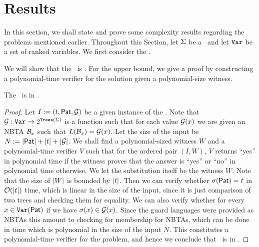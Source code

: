 \section{Results}\label{sec:results_atomicTreeTransforms}

In this section, we shall state and prove some complexity results regarding the problems mentioned earlier. Throughout this Section, let $\Sigma$ be a \rab\ and let $\texttt{Var}$ be a set of ranked variables. We first consider the \matchingProblemFull.

\begin{problem}
    \problemtitle{\matchingProblemFull}
\end{problem}

We will show that the \matchingProblemFull\ is \npc. For the upper bound, we give a proof by constructing a polynomial-time verifier for the solution given a polynomial-size witness.

\begin{theorem}\label{thm:matchingProblemUpperBound}
    The \matchingProblemFull\ is in \np.
\end{theorem}

\begin{proof}
    Let $I := (t, \mathsf{Pat}, \mathcal{G})$ be a given instance of the \matchingProblemFull. Note that $\mathcal{G} : \texttt{Var} \to 2^{\texttt{Trees}\left(\Sigma\right)}$ is a function such that for each value $\mathcal{G}(x)$ we are given an NBTA $\mathcal{B}_x$ such that $L(\mathcal{B}_x) = \mathcal{G}(x)$. Let the size of the input be $N := \left\lvert \mathsf{Pat} \right\rvert + \left\lvert t \right\rvert + \left\lvert \mathcal{G} \right\rvert$.
    We shall find a polynomial-sized witness $W$ and a polynomial-time verifier $V$ such that for the ordered pair $(I, W)$, $V$ returns ``yes'' in polynomial time if the witness proves that the answer is ``yes'' or ``no'' in polynomial time otherwise. We let the substitution itself be the witness $W$. Note that the size of $\left\lvert W \right\rvert$ is bounded by $\left\lvert t \right\rvert$. Then we can verify whether $\sigma(\mathsf{Pat}) = t$ in $\mathcal{O}(\left\lvert t \right\rvert)$ time, which is linear in the size of the input, since it is just comparison of two trees and checking them for equality. We can also verify whether for every $x \in \texttt{Var}(\mathsf{Pat})$ if we have $\sigma(x) \in \mathcal{G}(x)$. Since the guard languages were provided as NBTAs this amount to checking for membership for NBTAs, which can be done in time which is polynomial in the size of the input $N$. This constitutes a polynomial-time verifier for the problem, and hence we conclude that \matchingProblemFull\ is in \np.
\end{proof}


